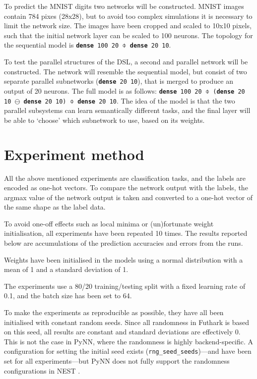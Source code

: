 \documentclass[report.tex]{subfiles}
\begin{document}
To predict the MNIST digits two networks will be constructed.
MNIST images contain 784 pixes (28x28), but to avoid too complex simulations
it is necessary to limit the network size.
The images have been cropped and scaled to 10x10 pixels, such that the initial
network layer can be scaled to 100 neurons.
The topology for the sequential model is \texttt{\textbf{dense} 100 20 $\obar$ \textbf{dense} 20 10}.

To test the parallel structures of the \gls{DSL}, a second and parallel network
will be constructed.
The network will resemble the sequential model, but consist of two separate
parallel subnetworks (\texttt{\textbf{dense} 20 10}), that is merged to produce
an output of 20 neurons.
The full model is as follows:
\texttt{\textbf{dense} 100 20 $\obar$ (\textbf{dense} 20 10 $\ominus$\
\textbf{dense} 20 10) $\obar$ \textbf{dense} 20 10}.
The idea of the model is that the two parallel subsystems can learn semantically
different tasks, and the final layer will be able to `choose' which subnetwork to
use, based on its weights.

\section{Experiment method}
All the above mentioned experiments are classification tasks, and the labels
are encoded as one-hot vectors.
To compare the network output with the labels, the argmax value of the network
output is taken and converted to a one-hot vector of the same shape as the label
data.

To avoid one-off effects such as local minima or (un)fortunate weight
initialisation, all experiments have been repeated 10 times.
The results reported below are accumulations of the prediction accuracies
and errors from the runs.

Weights have been initialised in the models using a normal distribution with a
mean of 1 and a standard deviation of 1.

The experiments use a 80/20 training/testing split with a fixed learning rate of
0.1, and the batch size has been set to 64.

To make the experiments as reproducible as possible, they have all been
initialised with constant random seeds.
Since all randomness in Futhark is based on this seed, all results are constant and
standard deviations are effectively 0.
This is not the case in PyNN, where the randomness is highly backend-specific.
A configuration for setting the initial seed exists
(\texttt{rng\_seed\_seeds})---and have been set for all experiments---but
PyNN does not fully support the randomness configurations in NEST
\cite{Gewaltig2007}.
\end{document}
